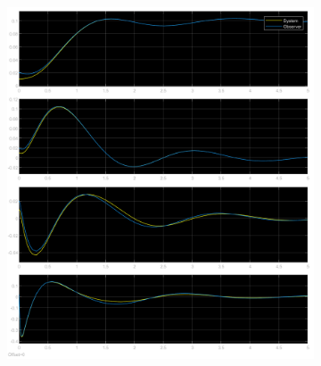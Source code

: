 \documentclass[class=article, crop=false]{standalone}
\begin{document}
\begin{resolution}
\begin{figure}[H]
\begin{subfigure}[b]{0.475\textwidth}
            \includegraphics[width=\textwidth]{../images/simulink_scope5_01_01_02.png}
            \caption{}
        \end{subfigure}
        \caption{}
    \end{figure}
\end{resolution}

\newpage
\end{document}
